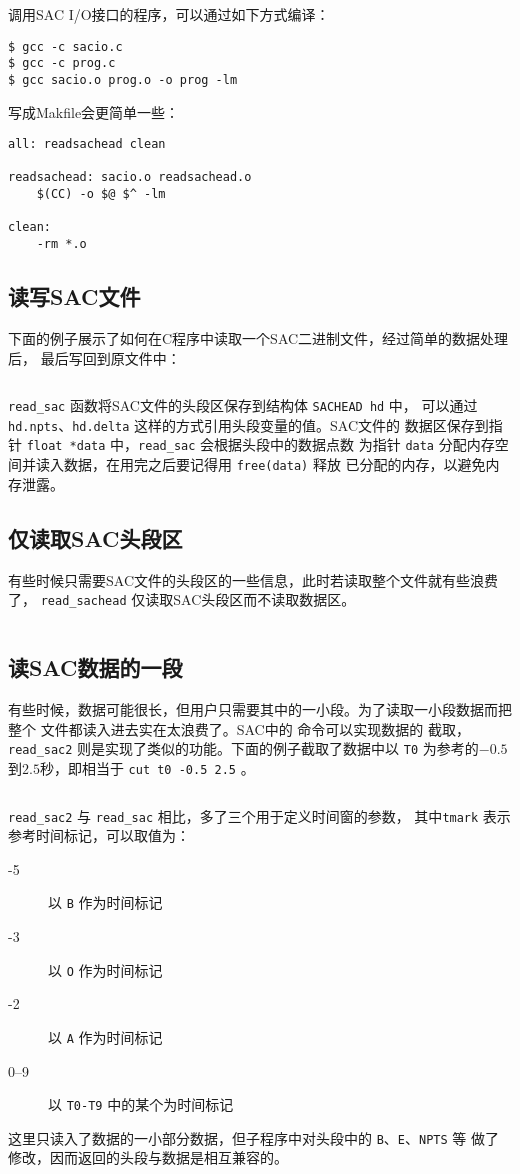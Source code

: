 调用SAC I/O接口的程序，可以通过如下方式编译：
\begin{verbatim}
$ gcc -c sacio.c
$ gcc -c prog.c
$ gcc sacio.o prog.o -o prog -lm
\end{verbatim}

写成Makfile会更简单一些：
\begin{verbatim}
all: readsachead clean

readsachead: sacio.o readsachead.o
    $(CC) -o $@ $^ -lm

clean:
    -rm *.o
\end{verbatim}

\subsection{读写SAC文件}
下面的例子展示了如何在C程序中读取一个SAC二进制文件，经过简单的数据处理后，
最后写回到原文件中：
\inputminted{C}{./sacio/readsac.c}
\verb|read_sac| 函数将SAC文件的头段区保存到结构体 \texttt{SACHEAD hd} 中，
可以通过 \texttt{hd.npts}、\texttt{hd.delta} 这样的方式引用头段变量的值。SAC文件的
数据区保存到指针 \texttt{float *data} 中，\verb|read_sac| 会根据头段中的数据点数
为指针 \texttt{data} 分配内存空间并读入数据，在用完之后要记得用 \texttt{free(data)} 释放
已分配的内存，以避免内存泄露。

\subsection{仅读取SAC头段区}
有些时候只需要SAC文件的头段区的一些信息，此时若读取整个文件就有些浪费了，
\verb|read_sachead| 仅读取SAC头段区而不读取数据区。
\inputminted{C}{./sacio/readsachead.c}

\subsection{读SAC数据的一段}
有些时候，数据可能很长，但用户只需要其中的一小段。为了读取一小段数据而把整个
文件都读入进去实在太浪费了。SAC中的  命令可以实现数据的
截取，\verb|read_sac2| 则是实现了类似的功能。下面的例子截取了数据中以 \texttt{T0}
为参考的$-0.5$到$2.5$秒，即相当于 \texttt{cut t0 -0.5 2.5} 。
\inputminted{C}{./sacio/readsac2.c}
\verb|read_sac2| 与 \verb|read_sac| 相比，多了三个用于定义时间窗的参数，
其中\texttt{tmark} 表示参考时间标记，可以取值为：
\begin{description}
\item[-5] 以 \texttt{B} 作为时间标记
\item[-3] 以 \texttt{O} 作为时间标记
\item[-2] 以 \texttt{A} 作为时间标记
\item[0--9] 以 \texttt{T0-T9} 中的某个为时间标记
\end{description}
这里只读入了数据的一小部分数据，但子程序中对头段中的 \texttt{B}、\texttt{E}、\texttt{NPTS} 等
做了修改，因而返回的头段与数据是相互兼容的。

